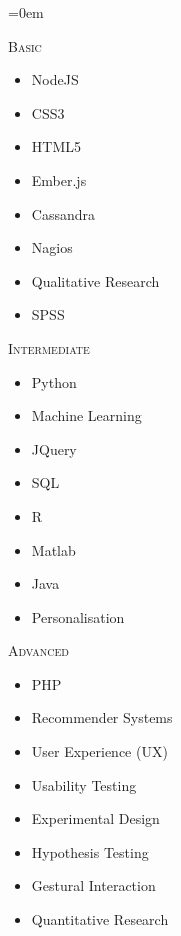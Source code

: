 \documentclass[a4paper]{scrartcl}
\newcommand{\Description}[1]{\hangindent=0em\hangafter=0\noindent\small{#1}\par\normalsize\vspace{1em}} %
\begin{document}
\Description{
\begin{center}
\begin{minipage}[t]{0.33333\textwidth}
\raggedright
\textsc{Basic}
\begin{itemize}
    \item NodeJS
    \item CSS3
    \item HTML5
    \item Ember.js
    \item Cassandra
    \item Nagios
    \item Qualitative Research
    \item SPSS
\end{itemize}
\end{minipage}%
\begin{minipage}[t]{0.33333\textwidth}
\textsc{Intermediate}
\raggedright
\begin{itemize}
    \item Python
    \item Machine Learning
    \item JQuery
    \item SQL
    \item R
    \item Matlab
    \item Java
    \item Personalisation
\end{itemize}
\end{minipage}%
\begin{minipage}[t]{0.33333\textwidth}
\textsc{Advanced}
\raggedright
\begin{itemize}
    \item PHP
    \item Recommender Systems
    \item User Experience (UX)
    \item Usability Testing
    \item Experimental Design
    \item Hypothesis Testing
    \item Gestural Interaction
    \item Quantitative Research
\end{itemize}
\end{minipage}
\end{center}
}
\end{document}
